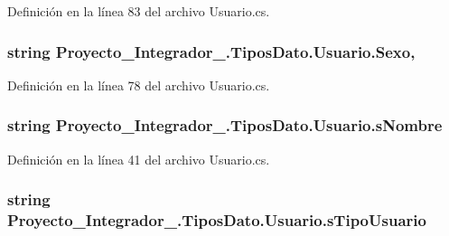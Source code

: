 Definición en la línea 83 del archivo Usuario.\-cs.

\hypertarget{class_proyecto___integrador__3_1_1_tipos_dato_1_1_usuario_ac9a394490635d1d8083c88df4d02a84e}{
\subsubsection[{Sexo}]{\setlength{\rightskip}{0pt plus 5cm}string Proyecto\-\_\-\-Integrador\-\_.\-Tipos\-Dato.\-Usuario.\-Sexo\hspace{0.3cm}{\ttfamily [get]}, {\ttfamily [set]}}}\label{class_proyecto___integrador__3_1_1_tipos_dato_1_1_usuario_ac9a394490635d1d8083c88df4d02a84e}


Definición en la línea 78 del archivo Usuario.\-cs.

\hypertarget{class_proyecto___integrador__3_1_1_tipos_dato_1_1_usuario_a22974b12ffb877b220ac230d9ce48615}{
\subsubsection[{s\-Nombre}]{\setlength{\rightskip}{0pt plus 5cm}string Proyecto\-\_\-\-Integrador\-\_.\-Tipos\-Dato.\-Usuario.\-s\-Nombre\hspace{0.3cm}{\ttfamily [get]}}}\label{class_proyecto___integrador__3_1_1_tipos_dato_1_1_usuario_a22974b12ffb877b220ac230d9ce48615}


Definición en la línea 41 del archivo Usuario.\-cs.

\hypertarget{class_proyecto___integrador__3_1_1_tipos_dato_1_1_usuario_a11a9f4324ce06becd4385cdf769f5c4e}{
\subsubsection[{s\-Tipo\-Usuario}]{\setlength{\rightskip}{0pt plus 5cm}string Proyecto\-\_\-\-Integrador\-\_.\-Tipos\-Dato.\-Usuario.\-s\-Tipo\-Usuario\hspace{0.3cm}{\ttfamily [get]}}}\label{class_proyecto___integrador__3_1_1_tipos_dato_1_1_usuario_a11a9f4324ce06becd4385cdf769f5c4e}


